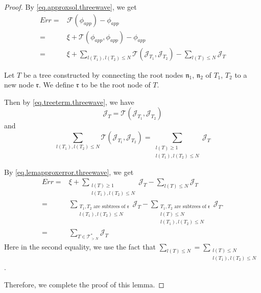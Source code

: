 \begin{proof} By \eqref{eq.approxsol.threewave}, we get
\begin{equation}\label{eq.lemapproxerror.threewave}
\begin{split}
    Err=&\mathcal{F}(\phi_{app})-\phi_{app}    
    \\
    =&\xi+\mathcal{T}(\phi_{app},\phi_{app})-\phi_{app}
    \\
    =&\xi+\sum_{l(T_1),l(T_2)\le N} \mathcal{T}(\mathcal{J}_{T_1},\mathcal{J}_{T_2})-\sum_{l(T)\le N} \mathcal{J}_T
\end{split}
\end{equation}

Let $T$ be a tree constructed by connecting the root nodes $\mathfrak{n}_1$, $\mathfrak{n}_2$ of $T_1$, $T_2$ to a new node $\mathfrak{r}$. We define $\mathfrak{r}$ to be the root node of $T$.

Then by \eqref{eq.treeterm.threewave}, we have
\begin{equation}
    \mathcal{J}_T=\mathcal{T}(\mathcal{J}_{T_1}, \mathcal{J}_{T_2})
\end{equation}
and 
\begin{equation}
    \sum_{l(T_1),l(T_2)\le N} \mathcal{T}(\mathcal{J}_{T_1},\mathcal{J}_{T_2})=\sum_{\substack{l(T)\ge 1\\ l(T_1),l(T_2)\le N}} \mathcal{J}_{T}
\end{equation}

By \eqref{eq.lemapproxerror.threewave}, we get
\begin{equation}
\begin{split}
    Err=&\xi+\sum_{\substack{l(T)\ge 1\\ l(T_1),l(T_2)\le N}} \mathcal{J}_{T}-\sum_{l(T)\le N} \mathcal{J}_T
    \\
    =&\sum_{\substack{T_1,T_2\text{ are subtrees of }\mathfrak{r}\\ l(T_1),l(T_2)\le N}} \mathcal{J}_{T}-\sum_{\substack{T_1,T_2\text{ are subtrees of }\mathfrak{r}\\l(T)\le N\\ l(T_1),l(T_2)\le N}} \mathcal{J}_T.
    \\
    =&\sum_{T\in \mathcal{T}_{>N}^*} \mathcal{J}_T
\end{split}
\end{equation}
Here in the second equality, we use the fact that $\sum_{l(T)\le N}=\sum_{\substack{l(T)\le N\\ l(T_1),l(T_2)\le N}}$.

Therefore, we complete the proof of this lemma.
\end{proof}

